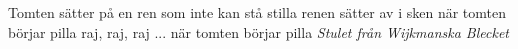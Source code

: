 \vspace{10pt}
\par
Tomten sätter på en ren
som inte kan stå stilla
renen sätter av i sken
när tomten börjar pilla
raj, raj, raj ...
när tomten börjar pilla
\vspace{10pt}
{\footnotesize\textit{Stulet från Wijkmanska Blecket}}
